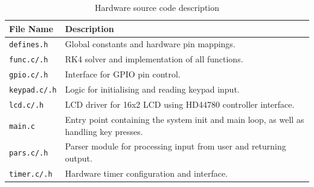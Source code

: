 \documentclass[conference]{IEEEtran}
\begin{document}
\begin{table}[H]
\centering
\caption{Hardware source code description}
\label{tab:file_org}
\small
\begin{tabularx}{\columnwidth}{|l|X|}
\hline
\textbf{File Name} & \textbf{Description} \\ \hline
\texttt{defines.h}  & Global constants and hardware pin mappings. \\ \hline
\texttt{func.c/.h}  & RK4 solver and implementation of all functions. \\ \hline
\texttt{gpio.c/.h}  & Interface for GPIO pin control. \\ \hline
\texttt{keypad.c/.h} & Logic for initialising and reading keypad input. \\ \hline
\texttt{lcd.c/.h}   & LCD driver for 16x2 LCD using HD44780 controller interface. \\ \hline
\texttt{main.c}     & Entry point containing the system init and main loop, as well as handling key presses. \\ \hline
\texttt{pars.c/.h}  & Parser module for processing input from user and returning output. \\ \hline
\texttt{timer.c/.h} & Hardware timer configuration and interface. \\ \hline
\end{tabularx}
\end{table}


\end{document}

